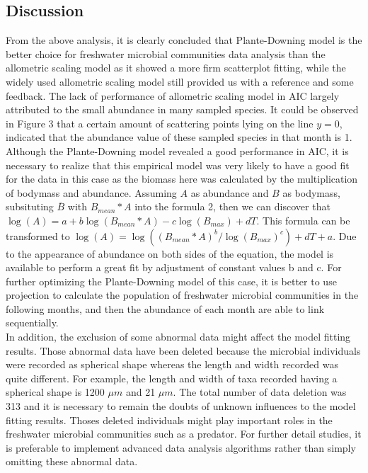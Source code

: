 \documentclass[11pt]{article}
\begin{document}
\begin{linenumbers}
\section*{Discussion}
From the above analysis, it is clearly concluded that Plante-Downing model is the better choice for freshwater microbial communities data analysis than the allometric scaling model as it showed a more firm scatterplot fitting, while the widely used allometric scaling model still provided us with a reference and some feedback.
The lack of performance of allometric scaling model in AIC largely attributed to the small abundance in many sampled species.
It could be observed in Figure 3 that a certain amount of scattering points lying on the line $y= 0$, indicated that the abundance value of these sampled species in that month is 1. \\
Although the Plante-Downing model revealed a good performance in AIC, it is necessary to realize that this empirical model was very likely to have a good fit for the data in this case as the biomass here was calculated by the multiplication of bodymass and abundance.
Assuming $A$ as abundance and $B$ as bodymass, subsituting $\overline{B}$ with ${B}_{mean}*A$ into the formula 2, then we can discover that $ \log(A) = a +b \log({B}_{mean}*A) - c \log(\mathit{B}_{max}) + d T$.
This formula can be transformed to $\log(A) = \log(({B}_{mean}*A)^b/\log(\mathit{B}_{max})^c) + d T + a$.
Due to the appearance of abundance on both sides of the equation, the model is available to perform a great fit by adjustment of constant values b and c.
For further optimizing the Plante-Downing model of this case, it is better to use projection to calculate the population of freshwater microbial communities in the following months, and then the abundance of each month are able to link sequentially.  \\
In addition, the exclusion of some abnormal data might affect the model fitting results. Those abnormal data have been deleted because the microbial individuals were recorded as spherical shape whereas the length and width recorded was quite different.
For example, the length and width of taxa recorded having a spherical shape is 1200 $\mu m$ and 21 $\mu m$. The total number of data deletion was 313 and it is necessary to remain the doubts of unknown influences to the model fitting results.
Thoses deleted individuals might play important roles in the freshwater microbial communities such as a predator. For further detail studies, it is preferable to implement advanced data analysis algorithms rather than simply omitting these abnormal data.


\end{linenumbers}
\end{document}
